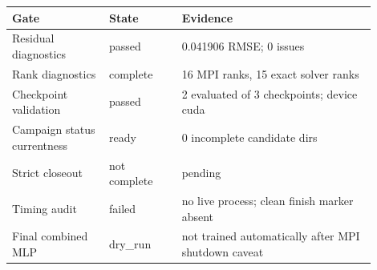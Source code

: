 \begin{tabular}{p{0.24\linewidth}p{0.18\linewidth}p{0.48\linewidth}}
\toprule
Gate & State & Evidence \\
\midrule
Residual diagnostics & passed & 0.041906 RMSE; 0 issues \\
Rank diagnostics & complete & 16 MPI ranks, 15 exact solver ranks \\
Checkpoint validation & passed & 2 evaluated of 3 checkpoints; device cuda \\
Campaign status currentness & ready & 0 incomplete candidate dirs \\
Strict closeout & not complete & pending \\
Timing audit & failed & no live process; clean finish marker absent \\
Final combined MLP & dry\_run & not trained automatically after MPI shutdown caveat \\
\bottomrule
\end{tabular}
